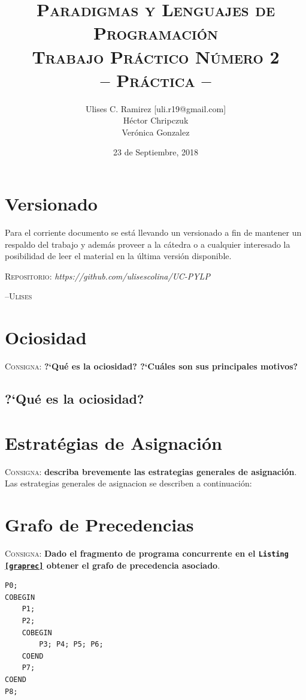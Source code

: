 \documentclass{article}
\title{\textsc{Paradigmas y Lenguajes de Programaci\'on\\Trabajo Pr\'actico N\'umero 2\\-- Pr\'actica --}}
\author{Ulises C. Ramirez [uli.r19@gmail.com]\\H\'ector Chripczuk\\Ver\'onica Gonzalez}
\date{23 de Septiembre, 2018}
\begin{document}
\maketitle
{}
\newpage
\section*{Versionado}
Para el corriente documento se est\'a llevando un versionado a fin de mantener un respaldo del trabajo y adem\'as proveer a la c\'atedra o a cualquier interesado la posibilidad de leer el material en la \'ultima versi\'on disponible.\\

\begin{center}
  \textsc{Repositorio}: \textit{https://github.com/ulisescolina/UC-PYLP}
\end{center}


\hfill--\textsc{Ulises}\tableofcontents
{}
\newpage


\section{Ociosidad}
\textsc{Consigna}: \textbf{?`Qu\'e es la ociosidad? ?`Cu\'ales son sus principales motivos?}
\subsection{?`Qu\'e es la ociosidad?}


\section{Estrat\'egias de Asignaci\'on}
\textsc{Consigna}: \textbf{describa brevemente las estrategias generales de asignaci\'on}.
Las estrategias generales de asignacion se describen a continuaci\'on:


\section{Grafo de Precedencias}
\label{sec:}
\textsc{Consigna}: \textbf{Dado el fragmento de programa concurrente en el \texttt{Listing \ref{graprec}} obtener el grafo de precedencia asociado}.

\begin{lstlisting}[caption={Fragmento de programa concurrente}, label=graprec]
P0;
COBEGIN
	P1;
	P2;
	COBEGIN
		P3; P4; P5; P6;
	COEND
	P7;
COEND
P8;
\end{lstlisting}
\end{document}
